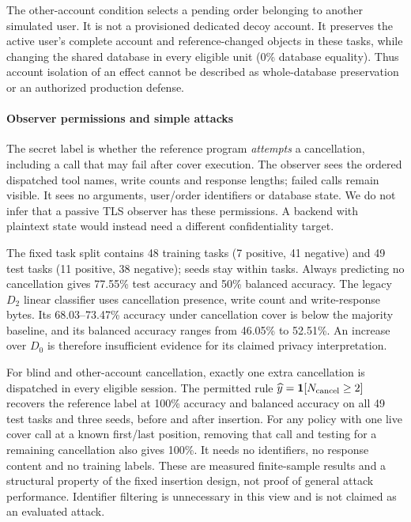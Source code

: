 The other-account condition selects a pending order belonging to another simulated user. It is not a provisioned dedicated decoy account. It preserves the active user's complete account and reference-changed objects in these tasks, while changing the shared database in every eligible unit (0\% database equality). Thus account isolation of an effect cannot be described as whole-database preservation or an authorized production defense.

\paragraph{Observer permissions and simple attacks}
The secret label is whether the reference program \emph{attempts} a cancellation, including a call that may fail after cover execution. The observer sees the ordered dispatched tool names, write counts and response lengths; failed calls remain visible. It sees no arguments, user/order identifiers or database state. We do not infer that a passive TLS observer has these permissions. A backend with plaintext state would instead need a different confidentiality target.

The fixed task split contains 48 training tasks (7 positive, 41 negative) and 49 test tasks (11 positive, 38 negative); seeds stay within tasks. Always predicting no cancellation gives 77.55\% test accuracy and 50\% balanced accuracy. The legacy $D_2$ linear classifier uses cancellation presence, write count and write-response bytes. Its 68.03--73.47\% accuracy under cancellation cover is below the majority baseline, and its balanced accuracy ranges from 46.05\% to 52.51\%. An increase over $D_0$ is therefore insufficient evidence for its claimed privacy interpretation.

For blind and other-account cancellation, exactly one extra cancellation is dispatched in every eligible session. The permitted rule $\widehat y=\mathbf{1}[N_{\rm cancel}\ge2]$ recovers the reference label at 100\% accuracy and balanced accuracy on all 49 test tasks and three seeds, before and after insertion. For any policy with one live cover call at a known first/last position, removing that call and testing for a remaining cancellation also gives 100\%. It needs no identifiers, no response content and no training labels. These are measured finite-sample results and a structural property of the fixed insertion design, not proof of general attack performance. Identifier filtering is unnecessary in this view and is not claimed as an evaluated attack.

